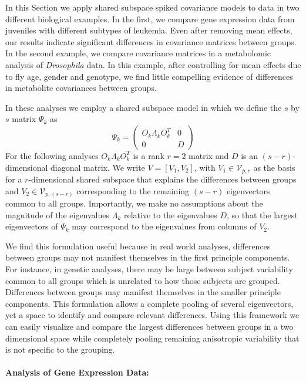 \documentclass[12pt]{article}
\begin{document}
In this Section we apply shared subspace spiked covariance models to data in two
different biological examples.  In the first, we compare gene
expression data from juveniles with different subtypes of leukemia.  Even
after removing mean effects, our results indicate significant differences
in covariance matrices between groups.  In the second example, we
compare covariance matrices in a metabolomic analysis of \textit{Drosophila} data.  In
this example, after controlling for mean effects due to fly age, gender and
genotype, we find little compelling evidence of differences in metabolite
covariances between groups. 

In these analyses we employ a shared subspace model in
which we define the $s$ by $s$ matrix $\Psi_k$ as
%
\begin{equation}
\Psi_k =\left( \begin{array}{cc}
O_k\Lambda_kO_k^T & 0  \\
0 & D  \end{array} \right)
\end{equation}
%
For the following analyses $O_k\Lambda_kO_k^T$ is a rank $r=2$ matrix
and $D$ is an $(s-r)$-dimensional diagonal matrix.  We write
$V = [V_1, V_2]$, with $V_1 \in \mathcal{V}_{p,r}$ as the basis for a
$r$-dimensional shared subspace that explains the differences between
groups and $V_2 \in \mathcal{V}_{p,(s-r)}$ corresponding to the remaining $(s-r)$
eigenvectors common to all groups.  Importantly, we make no assumptions about the
magnitude of the eigenvalues $\Lambda_k$ relative to the eigenvalues
$D$, so that the largest eigenvectors of $\Psi_k$ may correspond to
the eigenvalues from columns of $V_2$.  

We find this formulation useful because in real world analyses,
differences between groups may not manifest themselves in the first
principle components.  For instance, in genetic analyses, there may be
large between subject variability common to all groups which is
unrelated to how those subjects are grouped. Differences between
groups may manifest themselves in the smaller principle
components. This formulation allows a complete pooling of several
eigenvectors, yet a space to identify and compare relevant
differences.  Using this framework we can easily visualize and compare the
largest differences between groups in a two dimensional space while
completely pooling remaining anisotropic variability that is not
specific to the grouping.

\paragraph{Analysis of Gene Expression Data:}
\end{document}
